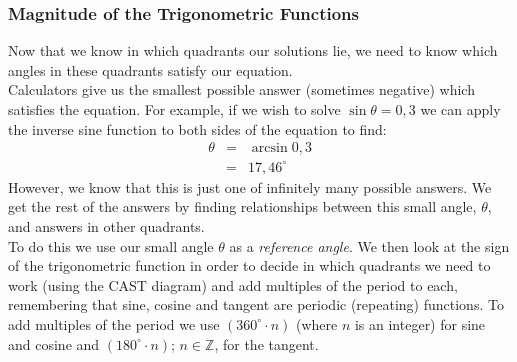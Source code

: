\subsubsection{Magnitude of the Trigonometric Functions}
Now that we know in which quadrants our solutions lie, we need to know which angles in these quadrants satisfy our equation.\\
Calculators give us the smallest possible answer (sometimes negative) which satisfies the equation. For example, if we wish to solve $\sin\theta=0,3$ we can apply the inverse sine function to both sides of the equation to find:
\begin{eqnarray*}
\theta&=&\arcsin 0,3 \\
&=& 17,46^\circ
\end{eqnarray*}
However, we know that this is just one of infinitely many possible answers. We get the rest of the answers by finding relationships between this small angle, $\theta$, and answers in other quadrants.\\
To do this we use our small angle $\theta$ as a \emph{reference angle}. We then look at the sign of the trigonometric function in order to decide in which quadrants we need to work (using the CAST diagram) and add multiples of the period to each, remembering that sine, cosine and tangent are periodic (repeating) functions. To add multiples of the period we use $(360^{\circ}\cdot n)$ (where $n$ is an integer) for sine and cosine and $(180^{\circ}\cdot n)$; $n \in \mathbb{Z}$, for the tangent. \\

